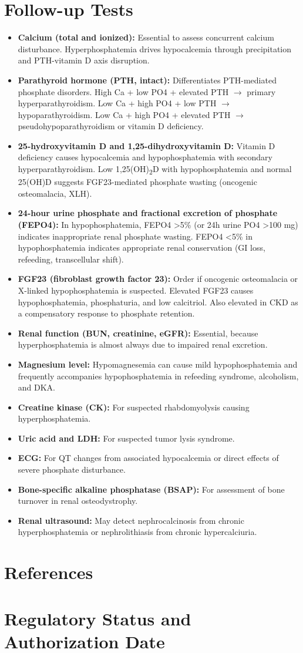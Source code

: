 \section*{Follow-up Tests}
\begin{itemize}
  \item \textbf{Calcium (total and ionized):} Essential to assess concurrent calcium disturbance. Hyperphosphatemia drives hypocalcemia through precipitation and PTH-vitamin D axis disruption.
  \item \textbf{Parathyroid hormone (PTH, intact):} Differentiates PTH-mediated phosphate disorders. High Ca + low PO4 + elevated PTH $\rightarrow$ primary hyperparathyroidism. Low Ca + high PO4 + low PTH $\rightarrow$ hypoparathyroidism. Low Ca + high PO4 + elevated PTH $\rightarrow$ pseudohypoparathyroidism or vitamin D deficiency.
  \item \textbf{25-hydroxyvitamin D and 1,25-dihydroxyvitamin D:} Vitamin D deficiency causes hypocalcemia and hypophosphatemia with secondary hyperparathyroidism. Low 1,25(OH)\textsubscript{2}D with hypophosphatemia and normal 25(OH)D suggests FGF23-mediated phosphate wasting (oncogenic osteomalacia, XLH).
  \item \textbf{24-hour urine phosphate and fractional excretion of phosphate (FEPO4):} In hypophosphatemia, FEPO4 >5\% (or 24h urine PO4 >100 mg) indicates inappropriate renal phosphate wasting. FEPO4 <5\% in hypophosphatemia indicates appropriate renal conservation (GI loss, refeeding, transcellular shift).
  \item \textbf{FGF23 (fibroblast growth factor 23):} Order if oncogenic osteomalacia or X-linked hypophosphatemia is suspected. Elevated FGF23 causes hypophosphatemia, phosphaturia, and low calcitriol. Also elevated in CKD as a compensatory response to phosphate retention.
  \item \textbf{Renal function (BUN, creatinine, eGFR):} Essential, because hyperphosphatemia is almost always due to impaired renal excretion.
  \item \textbf{Magnesium level:} Hypomagnesemia can cause mild hypophosphatemia and frequently accompanies hypophosphatemia in refeeding syndrome, alcoholism, and DKA.
  \item \textbf{Creatine kinase (CK):} For suspected rhabdomyolysis causing hyperphosphatemia.
  \item \textbf{Uric acid and LDH:} For suspected tumor lysis syndrome.
  \item \textbf{ECG:} For QT changes from associated hypocalcemia or direct effects of severe phosphate disturbance.
  \item \textbf{Bone-specific alkaline phosphatase (BSAP):} For assessment of bone turnover in renal osteodystrophy.
  \item \textbf{Renal ultrasound:} May detect nephrocalcinosis from chronic hyperphosphatemia or nephrolithiasis from chronic hypercalciuria.
\end{itemize}

\section*{References}



\clearpage
\section*{Regulatory Status and Authorization Date}

\clearpage
